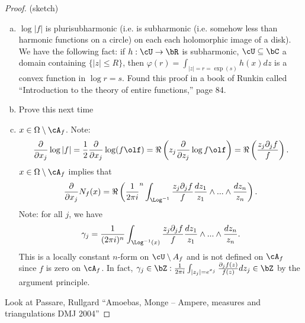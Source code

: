 \begin{proof}
  (sketch)
  \begin{enumerate}[(a)]
    \item $\log|f|$ is plurisubharmonic (i.e. is subharmonic (i.e. somehow less than harmonic functions on a circle) on each each holomorphic image of a disk). We have the following fact: if $h:\cU \to \bR$ is subharmonic, $\cU \subseteq \bC$ a domain containing $\{|z| \leq R\}$, then $\varphi(r) = \int_{|z| = r = \exp (s)} h(x) dz$ is a convex function in $\log r = s$. Found this proof in a book of Runkin called ``Introduction to the theory of entire functions,'' page 84.
    \item Prove this next time
    \item $x \in \Omega \setminus \cA_f$. Note:
      \begin{align*}
        \frac{\partial}{\partial x_j}\log |f| = \frac{1}{2} \frac{\partial}{\partial x_j} \log(f\olf) = \Re\left(z_j \frac{\partial}{\partial z_j} \log f\olf\right) = \Re\left(\frac{z_j\partial_j f}{f}\right).
      \end{align*}
      $x \in \Omega \setminus \cA_f$ implies that
      \begin{align*}
        \frac{\partial}{\partial x_j} N_f(x) = \Re\left(\frac{1}{2\pi i}^n \int_{\Log^{-1}} \frac{z_j\partial_j f}{f}\frac{dz_1}{z_1}\wedge ... \wedge \frac{dz_n}{z_n}\right).
      \end{align*}
      Note: for all $j$, we have
      \begin{align*}
        \gamma_j = \frac{1}{(2\pi i)^n} \int_{\Log^{-1}(x)} \frac{z_j\partial_j f}{f} \frac{dz_1}{z_1}\wedge ...\wedge \frac{dz_n}{z_n}.
      \end{align*}
      This is a locally constant $n$-form on $\cU\setminus A_f$ and is not defined on $\cA_f$ since $f$ is zero on $\cA_f$. In fact, $\gamma_j \in \bZ: \frac{1}{2\pi i} \int_{|z_j| = e^{x_j}} \frac{\partial_j f(z)}{f(z)} dz_j \in \bZ$ by the argument principle.
  \end{enumerate}

  Look at Passare, Rullgard ``Amoebas, Monge -- Ampere, measures and triangulations DMJ 2004''
\end{proof}
\printbibliography

